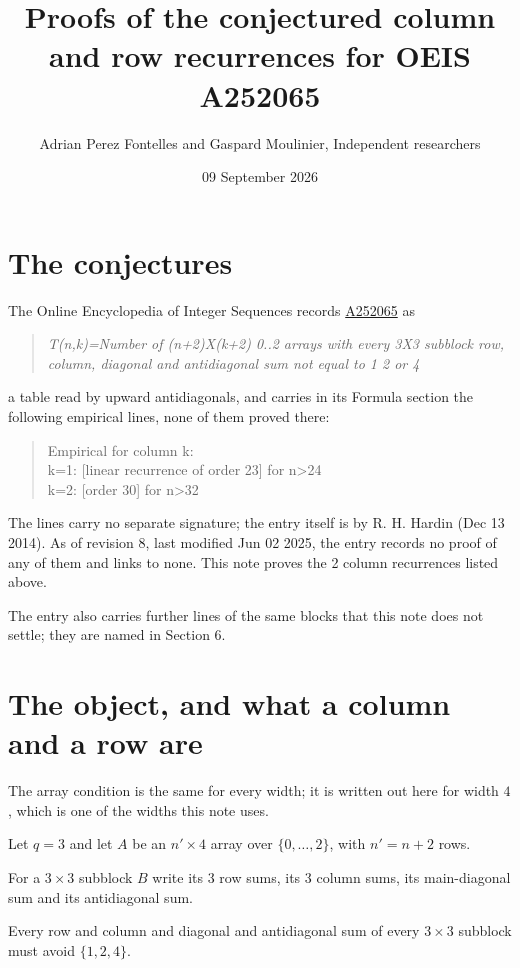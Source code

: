 \documentclass[11pt]{article}
\title{Proofs of the conjectured column and row recurrences for OEIS A252065}
\author{Adrian Perez Fontelles and Gaspard Moulinier, Independent researchers}
\date{09 September 2026}
\theoremstyle{definition}
\begin{document}
\maketitle
\section{The conjectures}

The Online Encyclopedia of Integer Sequences records \href{https://oeis.org/A252065}{A252065} as

\begin{quote}\itshape T(n,k)=Number of (n+2)X(k+2) 0..2 arrays with every 3X3 subblock row, column, diagonal and antidiagonal sum not equal to 1 2 or 4\end{quote}

a table read by upward antidiagonals, and carries in its Formula section the following empirical lines, none of them proved there:

\begin{quote}\ttfamily Empirical for column k:\\
k=1: [linear recurrence of order 23] for n>24\\k=2: [order 30] for n>32\end{quote}

The lines carry no separate signature; the entry itself is by R. H. Hardin (Dec 13 2014). As of revision 8, last modified Jun 02 2025, the entry records no proof of any of them and links to none. This note proves the 2 column recurrences listed above.

The entry also carries further lines of the same blocks that this note does not settle; they are named in Section 6.

\section{The object, and what a column and a row are}

The array condition is the same for every width; it is written out here for width $4$, which is one of the widths this note uses.

Let $q = 3$ and let $A$ be an $n' \times 4$ array over $\{0,\dots,2\}$, with $n' = n + 2$ rows.

For a $3\times3$ subblock $B$ write its 3 row sums, its 3 column sums, its main-diagonal sum and its antidiagonal sum.

Every row and column and diagonal and antidiagonal sum of every $3\times3$ subblock must avoid $\{1, 2, 4\}$.
\end{document}
